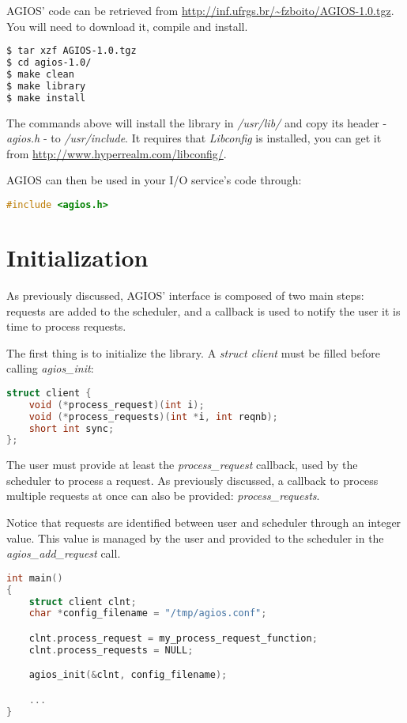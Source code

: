 AGIOS' code can be retrieved from \url{http://inf.ufrgs.br/~fzboito/AGIOS-1.0.tgz}. You will need to download it, compile and install.

\begin{lstlisting}[language=bash]
$ tar xzf AGIOS-1.0.tgz
$ cd agios-1.0/
$ make clean
$ make library
$ make install
\end{lstlisting}

The commands above will install the library in \emph{/usr/lib/} and copy its header - \emph{agios.h} -  to \emph{/usr/include}. It requires that \emph{Libconfig} is installed, you can get it from \url{http://www.hyperrealm.com/libconfig/}. 

AGIOS can then be used in your I/O service's code through:

\begin{lstlisting}[language=C]
#include <agios.h>
\end{lstlisting}

\section{Initialization}

As previously discussed, AGIOS' interface is composed of two main steps: requests are added to the scheduler, and a callback is used to notify the user it is time to process requests. 

The first thing is to initialize the library. A \emph{struct client} must be filled before calling \emph{agios\_init}:

\begin{lstlisting}[language=C]
struct client {
	void (*process_request)(int i);
	void (*process_requests)(int *i, int reqnb);
	short int sync; 
};
\end{lstlisting}

The user must provide at least the \emph{process\_request} callback, used by the scheduler to process a request. As previously discussed, a callback to process multiple requests at once can also be provided: \emph{process\_requests}. 

Notice that requests are identified between user and scheduler through an integer value. This value is managed by the user and provided to the scheduler in the \emph{agios\_add\_request} call.

\begin{lstlisting}[language=C]
int main()
{
	struct client clnt;
	char *config_filename = "/tmp/agios.conf";

	clnt.process_request = my_process_request_function;
	clnt.process_requests = NULL;

	agios_init(&clnt, config_filename);

	...
}
\end{lstlisting}

